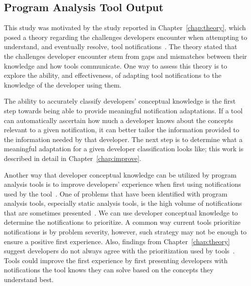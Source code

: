 \subsection{Program Analysis Tool Output}
This study was motivated by the study reported in Chapter~\ref{chap:theory}, which posed a theory regarding the challenges developers encounter when attempting to understand, and eventually resolve, tool notifications~\cite{johnson2016cross}. The theory stated that the challenges developer encounter stem from gaps and mismatches between their knowledge and how tools communicate. One way to assess this theory is to explore the ability, and effectiveness, of adapting tool notifications to the knowledge of the developer using them.


The ability to accurately classify developers' conceptual knowledge is the first step towards being able to provide meaningful notification adaptations. If a tool can automatically ascertain how much a developer knows about the concepts relevant to a given notification, it can better tailor the information provided to the information needed by that developer. The next step is to determine what a meaningful adaptation for a given developer classification looks like; this work is described in detail in Chapter~\ref{chap:improve}.

Another way that developer conceptual knowledge can be utilized by program analysis tools is to improve developers' experience when first using notifications used by the tool~\cite{johnson2015bespoke}. One of problems that have been identified with program analysis tools, especially static analysis tools, is the high volume of notifications that are sometimes presented~\cite{Johnson:2013:Why}. We can use developer conceptual knowledge to determine the notifications to prioritize. A common way current tools prioritize notifications is by problem severity, however, such strategy may not be enough to ensure a positive first experience. Also, findings from Chapter~\ref{chap:theory} suggest developers do not always agree with the prioritization used by tools~\cite{johnson2016cross}. Tools could improve the first experience by first presenting developers with notifications the tool knows they can solve based on the concepts they understand best.

